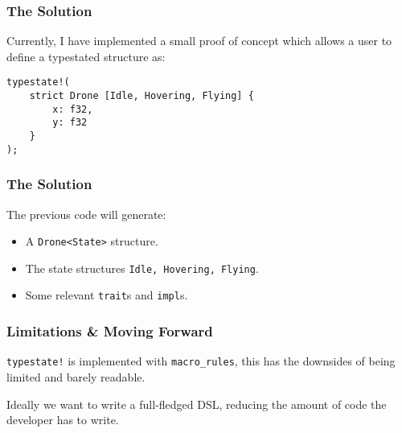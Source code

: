 \documentclass[notes]{beamer}
\begin{document}
\begin{frame}[fragile]
    \frametitle{The Solution}
    Currently, I have implemented a small proof of concept which allows a user to define a typestated structure as:
    \begin{lstlisting}
typestate!(
    strict Drone [Idle, Hovering, Flying] {
        x: f32,
        y: f32
    }
);
    \end{lstlisting}

\end{frame}

\begin{frame}[fragile]
    \frametitle{The Solution}
    The previous code will generate:
    \begin{itemize}
        \item A \texttt{Drone<State>} structure.
        \item The state structures \texttt{Idle, Hovering, Flying}.
        \item Some relevant \texttt{trait}s and \texttt{impl}s.
    \end{itemize}

\end{frame}

\begin{frame}[fragile]
    \frametitle{Limitations \& Moving Forward}
    \texttt{typestate!} is implemented with \texttt{macro\_rules},
    this has the downsides of being limited and barely readable.

    Ideally we want to write a full-fledged DSL,
    reducing the amount of code the developer has to write.

\end{frame}
\end{document}
